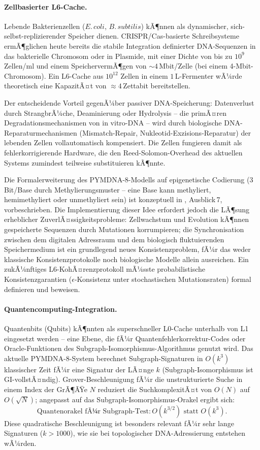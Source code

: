 ﻿\documentclass[a4paper,12pt]{article}
\theoremstyle{definition}
\begin{document}
\paragraph{Zellbasierter L6-Cache.}
Lebende Bakterienzellen ($E.\,coli$, $B.\,subtilis$) kÃ¶nnen als dynamischer, sich-selbst-replizierender Speicher dienen. CRISPR/Cas-basierte Schreibsysteme ermÃ¶glichen heute bereits die stabile Integration definierter DNA-Sequenzen in das bakterielle Chromosom oder in Plasmide, mit einer Dichte von bis zu $10^{9}$ Zellen/ml und einem SpeichervermÃ¶gen von $\sim 4$\,Mbit/Zelle (bei einem 4-Mbit-Chromosom). Ein L6-Cache aus $10^{12}$ Zellen in einem $1$\,L-Fermenter wÃ¼rde theoretisch eine KapazitÃ¤t von $\approx 4$\,Zettabit bereitstellen.

Der entscheidende Vorteil gegenÃ¼ber passiver DNA-Speicherung: Datenverlust durch StrangbrÃ¼che, Deaminierung oder Hydrolysis -- die primÃ¤ren Degradationsmechanismen von in vitro-DNA -- wird durch biologische DNA-Reparaturmechanismen (Mismatch-Repair, Nukleotid-Exzisions-Reparatur) der lebenden Zellen vollautomatisch kompensiert. Die Zellen fungieren damit als fehlerkorrigierende Hardware, die den Reed-Solomon-Overhead des aktuellen Systems zumindest teilweise substituieren kÃ¶nnte.

Die Formalerweiterung des PYMDNA-8-Modells auf epigenetische Codierung (3 Bit/Base durch Methylierungsmuster -- eine Base kann methyliert, hemimethyliert oder unmethyliert sein) ist konzeptuell in \cite{epp2026dnastor}, Ausblick\,7, vorbeschrieben. Die Implementierung dieser Idee erfordert jedoch die LÃ¶sung erheblicher ZuverlÃ¤ssigkeitsprobleme: Zellwachstum und Evolution kÃ¶nnen gespeicherte Sequenzen durch Mutationen korrumpieren; die Synchronisation zwischen dem digitalen Adressraum und dem biologisch fluktuierenden Speichermedium ist ein grundlegend neues Konsistenzproblem, fÃ¼r das weder klassische Konsistenzprotokolle noch biologische Modelle allein ausreichen. Ein zukÃ¼nftiges L6-KohÃ¤renzprotokoll mÃ¼sste probabilistische Konsistenzgarantien ($\epsilon$-Konsistenz unter stochastischen Mutationsraten) formal definieren und beweisen.

\paragraph{Quantencomputing-Integration.}
Quantenbits (Qubits) kÃ¶nnten als superschneller L0-Cache unterhalb von L1 eingesetzt werden -- eine Ebene, die fÃ¼r Quantenfehlerkorrektur-Codes oder Oracle-Funktionen des Subgraph-Isomorphismus-Algorithmus genutzt wird. Das aktuelle PYMDNA-8-System berechnet Subgraph-Signaturen in $O(k^3)$ klassischer Zeit fÃ¼r eine Signatur der LÃ¤nge $k$ (Subgraph-Isomorphismus ist GI-vollstÃ¤ndig). Grover-Beschleunigung fÃ¼r die unstrukturierte Suche in einem Index der GrÃ¶ÃŸe $N$ reduziert die SuchkomplexitÃ¤t von $O(N)$ auf $O(\sqrt{N})$; angepasst auf das Subgraph-Isomorphismus-Orakel ergibt sich:
\[
  \text{Quantenorakel fÃ¼r Subgraph-Test}: O(k^{3/2}) \text{ statt } O(k^3).
\]
Diese quadratische Beschleunigung ist besonders relevant fÃ¼r sehr lange Signaturen ($k > 1000$), wie sie bei topologischer DNA-Adressierung entstehen wÃ¼rden.
\end{document}
